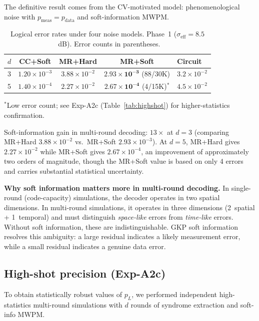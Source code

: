 \documentclass[twocolumn,showpacs,preprintnumbers,amsmath,amssymb,superscriptaddress]{revtex4-2}
\begin{document}
The definitive result comes from the CV-motivated model: phenomenological noise with $p_{\mathrm{meas}} = p_{\mathrm{data}}$ and soft-information MWPM.

\begin{table}[h]
\caption{Logical error rates under four noise models. Phase~1 ($\sigma_{\mathrm{eff}} = 8.5$~dB). Error counts in parentheses.}
\label{tab:cv_correct}
\begin{ruledtabular}
\begin{tabular}{lcccl}
$d$ & CC+Soft & MR+Hard & \textbf{MR+Soft} & Circuit \\
\hline
3 & $1.20{\times}10^{-3}$ & $3.88{\times}10^{-2}$ & $\mathbf{2.93{\times}10^{-3}}$ (88/30K) & $3.2{\times}10^{-2}$ \\
5 & $1.40{\times}10^{-4}$ & $2.27{\times}10^{-2}$ & $\mathbf{2.67{\times}10^{-4}}$ (4/15K)$^*$ & $4.5{\times}10^{-2}$ \\
\end{tabular}
\end{ruledtabular}
\footnotesize{$^*$Low error count; see Exp-A2c (Table~\ref{tab:highshot}) for higher-statistics confirmation.}
\end{table}

Soft-information gain in multi-round decoding: $13\times$ at $d=3$ (comparing MR+Hard $3.88 \times 10^{-2}$ vs.\ MR+Soft $2.93 \times 10^{-3}$). At $d = 5$, MR+Hard gives $2.27 \times 10^{-2}$ while MR+Soft gives $2.67 \times 10^{-4}$, an improvement of approximately two orders of magnitude, though the MR+Soft value is based on only 4 errors and carries substantial statistical uncertainty.

\textbf{Why soft information matters more in multi-round decoding.} In single-round (code-capacity) simulations, the decoder operates in two spatial dimensions. In multi-round simulations, it operates in three dimensions (2~spatial + 1~temporal) and must distinguish \emph{space-like} errors from \emph{time-like} errors. Without soft information, these are indistinguishable. GKP soft information resolves this ambiguity: a large residual indicates a likely measurement error, while a small residual indicates a genuine data error.

\subsection{High-shot precision (Exp-A2c)}

To obtain statistically robust values of $p_L$, we performed independent high-statistics multi-round simulations with $d$ rounds of syndrome extraction and soft-info MWPM.
\end{document}
